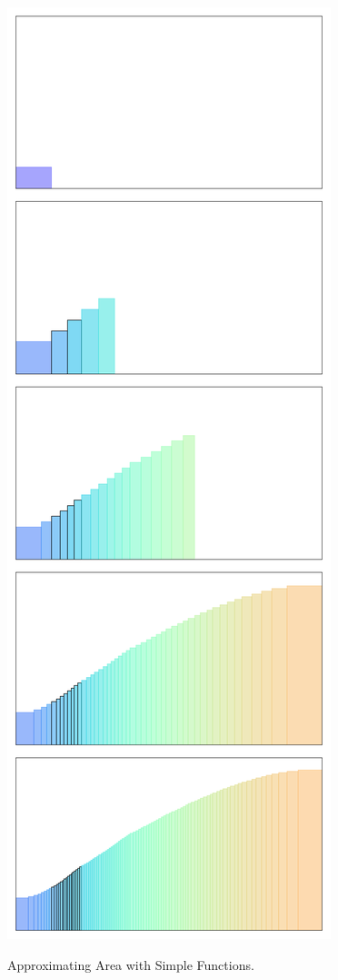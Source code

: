 \begin{figure}[H]
{		\includegraphics[scale=0.5]{Code/LebesgueExample2.png}}
	\caption{Approximating Area with Simple Functions.}
\end{figure}